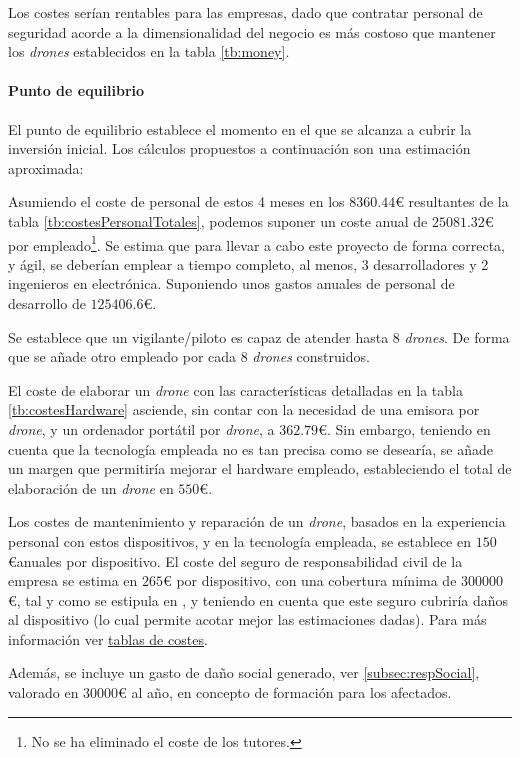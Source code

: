 Los costes serían rentables para las empresas, dado que contratar personal de seguridad acorde a la dimensionalidad del negocio es más costoso que mantener los \emph{drones} establecidos en la tabla \ref{tb:money}.

\paragraph{Punto de equilibrio} El punto de equilibrio establece el momento en el que se alcanza a cubrir la inversión inicial. Los cálculos propuestos a continuación son una estimación aproximada: 

Asumiendo el coste de personal de estos 4 meses en los $8360.44$\euro{} resultantes de la tabla \ref{tb:costesPersonalTotales}, podemos suponer un coste anual de $25081.32$\euro{} por empleado\footnote{No se ha eliminado el coste de los tutores.}. 
Se estima que para llevar a cabo este proyecto de forma correcta, y ágil, se deberían emplear a tiempo completo, al menos, 3 desarrolladores y 2 ingenieros en electrónica. Suponiendo unos gastos anuales de personal de desarrollo de $125406.6$\euro.

Se establece que un vigilante/piloto es capaz de atender hasta 8 \emph{drones}. De forma que se añade otro empleado por cada 8 \emph{drones} construidos.

El coste de elaborar un \emph{drone} con las características detalladas en la tabla \ref{tb:costesHardware} asciende, sin contar con la necesidad de una emisora por \emph{drone}, y un ordenador portátil por \emph{drone}, a $362.79$\euro. Sin embargo, teniendo en cuenta que la tecnología empleada no es tan precisa como se desearía, se añade un margen que permitiría mejorar el hardware empleado, estableciendo el total de elaboración de un \emph{drone} en $550$\euro. 

Los costes de mantenimiento y reparación de un \emph{drone}, basados en la experiencia personal con estos dispositivos, y en la tecnología empleada, se establece en $150$\euro anuales por dispositivo. El coste del seguro de responsabilidad civil de la empresa se estima en $265$\euro{} por dispositivo, con una cobertura mínima de $300000$\euro, tal y como se estipula en \citep{wiki:respCivil}, y teniendo en cuenta que este seguro cubriría daños al dispositivo (lo cual permite acotar mejor las estimaciones dadas). Para más información ver \href{https://www.aenus.es/responsabilidad-civil-danos-profesional/}{tablas de costes}. 

Además, se incluye un gasto de daño social generado, ver \ref{subsec:respSocial}, valorado en $30000$\euro{} al año, en concepto de formación para los afectados. 

